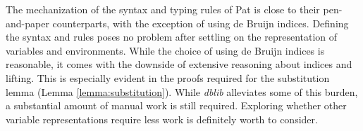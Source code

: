 
The mechanization of the syntax and typing rules of Pat is close to their pen-and-paper counterparts,
with the exception of using de Bruijn indices.
Defining the syntax and rules poses no problem after settling on the representation of variables and environments.
While the choice of using de Bruijn indices is reasonable, it comes with the downside of extensive reasoning about indices and lifting.
This is especially evident in the proofs required for the substitution lemma (Lemma \ref{lemma:substitution}).
While \emph{dblib} alleviates some of this burden, a substantial amount of manual work is still required.
Exploring whether other variable representations require less work is definitely worth to consider.


